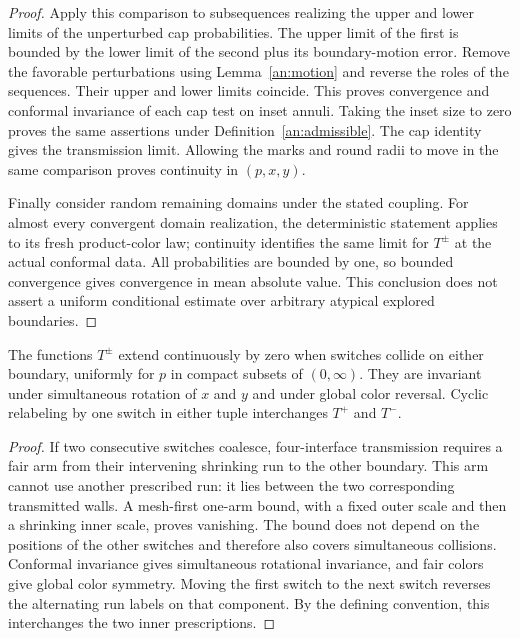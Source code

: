 \begin{proof}
Apply this comparison to subsequences realizing the upper and lower
limits of the unperturbed cap probabilities.  The upper limit of the
first is bounded by the lower limit of the second plus its boundary-motion
error.  Remove the favorable perturbations using Lemma~\ref{an:motion}
and reverse the roles of the sequences.  Their upper and lower limits
coincide.  This proves convergence and conformal invariance of each cap
test on inset annuli.  Taking the inset size to zero proves the same
assertions under Definition~\ref{an:admissible}.  The cap identity gives
the transmission limit.  Allowing the marks and round radii to move in
the same comparison proves continuity in $(p,x,y)$.

Finally consider random remaining domains under the stated coupling.
For almost every convergent domain realization, the deterministic
statement applies to its fresh product-color law; continuity identifies
the same limit for $T^\pm$ at the actual conformal data.  All probabilities
are bounded by one, so bounded convergence gives convergence in mean
absolute value.  This conclusion does not assert a uniform conditional
estimate over arbitrary atypical explored boundaries.
\end{proof}

\begin{lemma}\label{an:collision}
The functions $T^\pm$ extend continuously by zero when switches collide
on either boundary, uniformly for $p$ in compact subsets of $(0,\infty)$.
They are invariant under simultaneous rotation of $x$ and $y$ and under
global color reversal.  Cyclic relabeling by one switch in either tuple
interchanges $T^+$ and $T^-$.
\end{lemma}

\begin{proof}
\leavevmode{}
If two consecutive switches coalesce, four-interface transmission
requires a fair arm from their intervening shrinking run to the other
boundary.  This arm cannot use another prescribed run: it lies between
the two corresponding transmitted walls.  A mesh-first one-arm bound,
with a fixed outer scale and then a shrinking inner scale, proves
vanishing.  The bound does not depend on the positions of the other
switches and therefore also covers simultaneous collisions.
Conformal invariance gives simultaneous rotational invariance, and
fair colors give global color symmetry.  Moving the first switch to the
next switch reverses the alternating run labels on that component.
By the defining convention, this interchanges the two inner prescriptions.
\end{proof}
